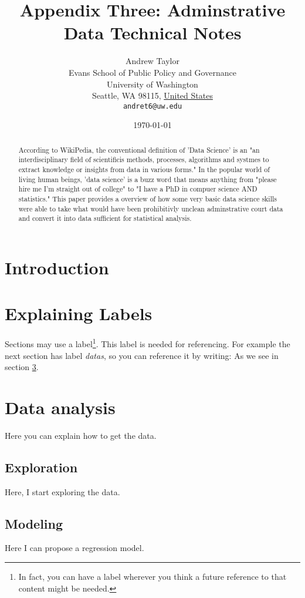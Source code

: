 \documentclass[11pt]{article}
\title{Appendix Three: Adminstrative Data Technical Notes}
\author{
        Andrew Taylor\\
        Evans School of Public Policy and Governance\\
        University of Washington\\
        Seattle, WA 98115, \underline{United States}\\
        \texttt{andret6@uw.edu}
}
\date{\today}
\begin{document}


\maketitle


\begin{abstract}
According to WikiPedia, the conventional definition of 'Data Science' is an "an interdisciplinary field of scientificis methods, processes, algorithms and systmes to extract knowledge or insights from data in various forms." In the popular world of living human beings, 'data science' is a buzz word that means anything from "please hire me I'm straight out of college" to "I have a PhD in compuer science AND statistics." This paper provides a overview of how some very basic data science skills were able to take what would have been prohibitivly unclean adminstrative court data and convert it into data sufficient for statistical analysis.

\end{abstract}

\section{Introduction}\label{intro}


\section{Explaining Labels}\label{outline}

Sections may use a label\footnote{In fact, you can have a label wherever you think a future reference to that content might be needed.}. This label is needed for referencing. For example the next section has label \emph{datas}, so you can reference it by writing: As we see in section \ref{datas}.

\section{Data analysis}\label{datas}

Here you can explain how to get the data.

\subsection{Exploration}\label{eda}

Here, I start exploring the data. 

\subsection{Modeling}\label{model}

Here I can propose a regression model.
\end{document}
